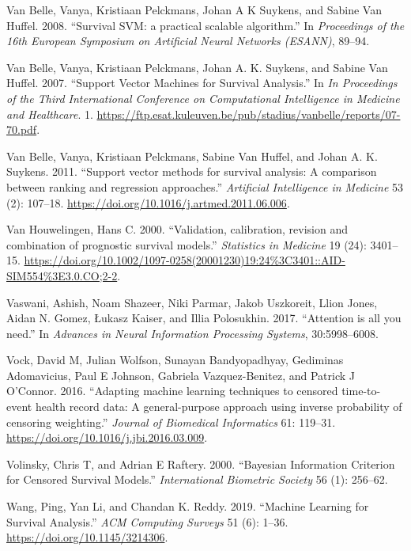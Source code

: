\documentclass[
  letterpaper,
  krantz2]{style/krantz}
\newlength{\cslhangindent}
\newenvironment{CSLReferences}[2] %
 {\begin{list}{}{%
  \setlength{\itemindent}{0pt}
  \setlength{\leftmargin}{0pt}
  \setlength{\parsep}{0pt}
  \ifodd #1
   \setlength{\leftmargin}{\cslhangindent}
   \setlength{\itemindent}{-1\cslhangindent}
  \fi
  \setlength{\itemsep}{#2\baselineskip}}}
 {\end{list}}
\begin{document}
\begin{CSLReferences}{1}{0}
Van Belle, Vanya, Kristiaan Pelckmans, Johan A K Suykens, and Sabine Van
Huffel. 2008. {``{Survival SVM: a practical scalable algorithm}.''} In
\emph{Proceedings of the 16th European Symposium on Artificial Neural
Networks (ESANN)}, 89--94.

Van Belle, Vanya, Kristiaan Pelckmans, Johan A. K. Suykens, and Sabine
Van Huffel. 2007. {``{Support Vector Machines for Survival Analysis}.''}
In \emph{In Proceedings of the Third International Conference on
Computational Intelligence in Medicine and Healthcare}. 1.
\url{https://ftp.esat.kuleuven.be/pub/stadius/vanbelle/reports/07-70.pdf}.

Van Belle, Vanya, Kristiaan Pelckmans, Sabine Van Huffel, and Johan A.
K. Suykens. 2011. {``{Support vector methods for survival analysis: A
comparison between ranking and regression approaches}.''}
\emph{Artificial Intelligence in Medicine} 53 (2): 107--18.
\url{https://doi.org/10.1016/j.artmed.2011.06.006}.

Van Houwelingen, Hans C. 2000. {``{Validation, calibration, revision and
combination of prognostic survival models}.''} \emph{Statistics in
Medicine} 19 (24): 3401--15.
\url{https://doi.org/10.1002/1097-0258(20001230)19:24\%3C3401::AID-SIM554\%3E3.0.CO;2-2}.

Vaswani, Ashish, Noam Shazeer, Niki Parmar, Jakob Uszkoreit, Llion
Jones, Aidan N. Gomez, Łukasz Kaiser, and Illia Polosukhin. 2017.
{``{Attention is all you need}.''} In \emph{Advances in Neural
Information Processing Systems}, 30:5998--6008.

Vock, David M, Julian Wolfson, Sunayan Bandyopadhyay, Gediminas
Adomavicius, Paul E Johnson, Gabriela Vazquez-Benitez, and Patrick J
O'Connor. 2016. {``{Adapting machine learning techniques to censored
time-to-event health record data: A general-purpose approach using
inverse probability of censoring weighting}.''} \emph{Journal of
Biomedical Informatics} 61: 119--31.
\url{https://doi.org/10.1016/j.jbi.2016.03.009}.

Volinsky, Chris T, and Adrian E Raftery. 2000. {``{Bayesian Information
Criterion for Censored Survival Models}.''} \emph{International
Biometric Society} 56 (1): 256--62.

Wang, Ping, Yan Li, and Chandan K. Reddy. 2019. {``{Machine Learning for
Survival Analysis}.''} \emph{ACM Computing Surveys} 51 (6): 1--36.
\url{https://doi.org/10.1145/3214306}.


\end{CSLReferences}
\end{document}
